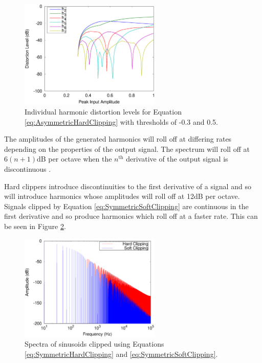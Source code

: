 			\begin{figure}[h!]
				\centering
				\includegraphics[width=0.6\textwidth]{chapter3/Images/AsymmetricHardClippingHarmonics.eps}
				\caption{Individual harmonic distortion levels for Equation
					 \ref{eq:AsymmetricHardClipping} with thresholds of -0.3 and 0.5.}
				\label{fig:AsymmetricHardClippingHarmonics}
			\end{figure}

			The amplitudes of the generated harmonics will roll off at differing rates depending on the
			properties of the output signal. The spectrum will roll off at $6(n+1)$dB per octave when the
			$n^{\text{th}}$ derivative of the output signal is discontinuous \citep{kraght2000aliasing}.

			Hard clippers introduce discontinuities to the first derivative of a signal and so will introduce
			harmonics whose amplitudes will roll off at 12dB per octave. Signals clipped by Equation
			\ref{eq:SymmetricSoftClipping} are continuous in the first derivative and so produce harmonics
			which roll off at a faster rate. This can be seen in Figure \ref{fig:ClippingSpectra}.

			\begin{figure}[h!]
				\centering
				\includegraphics[width=0.6\textwidth]{chapter3/Images/ClippingSpectra.eps}
				\caption{Spectra of sinusoids clipped using Equations \ref{eq:SymmetricHardClipping} and
			                 \ref{eq:SymmetricSoftClipping}.}
				\label{fig:ClippingSpectra}
			\end{figure}

